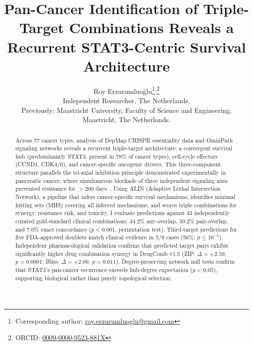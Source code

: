 \documentclass[11pt]{article}
\providecommand{\shorttitle}[1]{}
\begin{document}
\title{Pan-Cancer Identification of Triple-Target Combinations Reveals a Recurrent STAT3-Centric Survival Architecture}
\shorttitle{Pan-Cancer Triple-Target Combinations}

\author{Roy Erzurumluoğlu\thanks{Corresponding author: \href{mailto:roy.erzurumluoglu@gmail.com}{roy.erzurumluoglu@gmail.com}}$^{,}$\thanks{ORCID: \href{https://orcid.org/0009-0000-9523-881X}{0009-0000-9523-881X}}\\
  Independent Researcher, The Netherlands.\\
  {\small Previously: Maastricht University, Faculty of Science and Engineering, Maastricht, The Netherlands.}}

\maketitle

\begin{abstract}
Across 77 cancer types, analysis of DepMap CRISPR essentiality data and OmniPath signaling networks reveals a recurrent triple-target architecture: a convergent survival hub (predominantly STAT3, present in 78\% of cancer types), cell-cycle effectors (CCND1, CDK4/6), and cancer-specific oncogenic drivers. This three-component structure parallels the tri-axial inhibition principle demonstrated experimentally in pancreatic cancer, where simultaneous blockade of three independent signaling axes prevented resistance for $>$200 days~\cite{Liaki2025}. Using ALIN (Adaptive Lethal Intersection Network), a pipeline that infers cancer-specific survival mechanisms, identifies minimal hitting sets (MHS) covering all inferred mechanisms, and scores triple combinations for synergy, resistance risk, and toxicity, I evaluate predictions against 43 independently curated gold-standard clinical combinations: 44.2\% any-overlap, 30.2\% pair-overlap, and 7.0\% exact concordance ($p < 0.001$, permutation test). Third-target predictions for five FDA-approved doublets match clinical evidence in 5/9 cases (56\%; $p \leq 10^{-5}$). Independent pharmacological validation confirms that predicted target pairs exhibit significantly higher drug combination synergy in DrugComb v1.5 (ZIP: $\Delta = +2.59$, $p = 0.0001$; Bliss: $\Delta = +2.00$, $p = 0.011$). Degree-preserving network null tests confirm that STAT3's pan-cancer recurrence exceeds hub-degree expectation ($p < 0.05$), supporting biological rather than purely topological selection.
\end{abstract}
\end{document}
